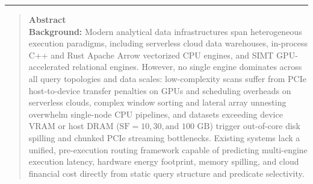 \documentclass[10pt,a4paper]{article}
\begin{document}
\noindent\rule{\textwidth}{0.8pt}
\begin{quote}
\small\sffamily
\textbf{\color{springerblue}Abstract}\\[0.3em]
\textbf{Background:} Modern analytical data infrastructures span heterogeneous execution paradigms, including serverless cloud data warehouses, in-process C++ and Rust Apache Arrow vectorized CPU engines, and SIMT GPU-accelerated relational engines. However, no single engine dominates across all query topologies and data scales: low-complexity scans suffer from PCIe host-to-device transfer penalties on GPUs and scheduling overheads on serverless clouds, complex window sorting and lateral array unnesting overwhelm single-node CPU pipelines, and datasets exceeding device VRAM or host DRAM ($\text{SF}=10, 30, \text{and } 100\text{ GB}$) trigger out-of-core disk spilling and chunked PCIe streaming bottlenecks. Existing systems lack a unified, pre-execution routing framework capable of predicting multi-engine execution latency, hardware energy footprint, memory spilling, and cloud financial cost directly from static query structure and predicate selectivity.\\[0.25em]

\end{quote}
\end{document}
